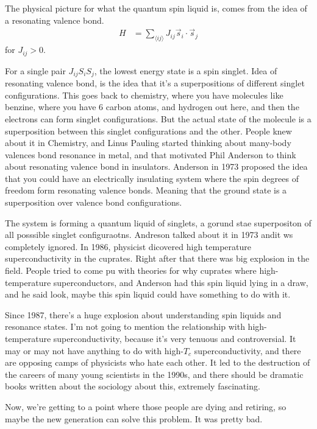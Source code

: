 The physical picture for what the quantum spin liquid is,
comes from the idea of a resonating valence bond.
\begin{align}
    H &=
    \sum_{\langle ij\rangle}
    J_{ij} \vec{s}_{i} \cdot \vec{s}_{j}
\end{align}
for $J_{ij}>0$.

For a single pair $J_{ij} S_i S_j$,
the lowest energy state is a spin singlet.
Idea of resonating valence bond,
is the idea that it's a superpositions of different singlet configurations.
This goes back to chemistry,
where you have molecules like benzine,
where you have 6 carbon atoms,
and hydrogen out here,
and then the electrons can form singlet configurations.
But the actual state of the molecule is a superposition between this singlet
configurations and the other.
People knew about it in Chemistry,
and Linus Pauling started thinking about many-body valences bond resonance in
metal,
and that motivated Phil Anderson to think about resonating valence bond in
insulators.
Anderson in 1973 proposed the idea that you could have an electrically
insulating system where the spin degrees of freedom form resonating valence
bonds.
Meaning that the ground state is a superposition over valence bond
configurations.

The system is forming a quantum liquid of singlets,
a gorund stae superpositon of all posssible singlet configuraotns.
Andreson talked about it in 1973 andit ws completely ignored.
In 1986,
physicist dicovered high temperature superconductivity in the cuprates.
Right after that there was  big explosion in the field.
People tried to come pu with theories for why cuprates where high-temperature
superconductors,
and Anderson had this spin liquid lying in a draw,
and he said look,
maybe this spin liquid could have something to do with it.

Since 1987,
there's a huge explosion about understanding spin liquids and resonance states.
I'm not going to mention the relationship with high-temperature superconductivity,
because it's very tenuous and controversial.
It may or may not have anything to do with high-$T_c$ superconductivity,
and there are opposing camps of physicists who hate each other.
It led to the destruction of the careers of many young scientists in the
1990s,
and there should be dramatic books written about the sociology about this,
extremely fascinating.

Now,
we're getting to a point where those people are dying and retiring,
so maybe the new generation can solve this problem.
It was pretty bad.


